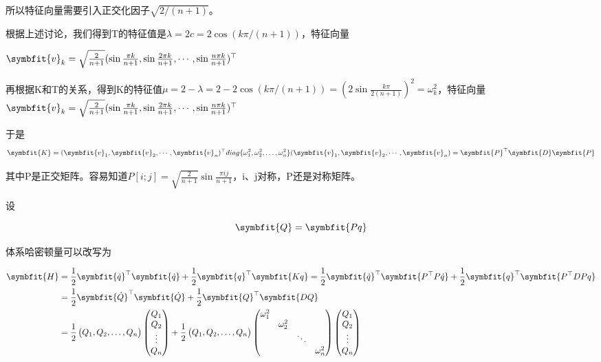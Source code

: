 \documentclass[10pt, a4paper]{article}
\newcommand\vbf{\symbfit}
\begin{document}
    所以特征向量需要引入正交化因子$\sqrt{2/(n+1)}$。

    根据上述讨论，我们得到T的特征值是$\lambda=2c=2\cos (k\pi/(n+1))$，特征向量
    
    $\vbf{v}_k=\sqrt{\frac{2}{n+1}}(\sin\frac{\pi k}{n+1},\sin\frac{2\pi k}{n+1},\cdots,\sin\frac{n\pi k}{n+1})^\top$

    再根据K和T的关系，得到K的特征值$\mu=2-\lambda=2-2\cos (k\pi/(n+1))=(2\sin\frac{k\pi}{2(n+1)})^2=\omega_k^2$，特征向量$\vbf{v}_k=\sqrt{\frac{2}{n+1}}(\sin\frac{\pi k}{n+1},\sin\frac{2\pi k}{n+1},\cdots,\sin\frac{n\pi k}{n+1})^\top$

    于是
    \[\vbf{K}=(\vbf{v}_1,\vbf{v}_2,\cdots,\vbf{v}_n)^\top diag\{\omega_1^2,\omega_2^2,\dots,\omega_n^2\}(\vbf{v}_1,\vbf{v}_2,\cdots,\vbf{v}_n)=\vbf{P}^\top\vbf{D}\vbf{P}\]

    其中P是正交矩阵。容易知道$P[i;j]=\sqrt{\frac{2}{n+1}}\sin\frac{\pi i j}{n+1}$，i、j对称，P还是对称矩阵。

    设

    \begin{equation}
        \vbf{Q}=\vbf{Pq}
    \end{equation}\label{eq:真实位形到简正模式的变换}
    
    体系哈密顿量可以改写为

    \begin{align*}
        \vbf{H}&=\frac{1}{2}\vbf{\dot{q} }^\top \vbf{\dot{q} }+\frac{1}{2}\vbf{q}^\top \vbf{Kq}=\frac{1}{2}\vbf{\dot{q} }^\top \vbf{P^\top P\dot{q} }+\frac{1}{2}\vbf{q}^\top \vbf{P^\top D P q}\\
        &=\frac{1}{2}\vbf{\dot{Q} }^\top \vbf{\dot{Q} }+\frac{1}{2}\vbf{Q}^\top \vbf{DQ}\\
        &=\frac{1}{2}\begin{pmatrix}
            Q_1,Q_2,\dots,Q_n
        \end{pmatrix}
        \begin{pmatrix}
            Q_1\\
            Q_2\\
            \vdots\\
            Q_n
        \end{pmatrix}   
        +\frac{1}{2}
        \begin{pmatrix}
            Q_1,Q_2,\dots,Q_n
        \end{pmatrix}
        \begin{pmatrix}
            \omega_1^2&&&\\
            &\omega_2^2&&\\
            &&\ddots&\\
            &&&\omega_n^2
        \end{pmatrix}
        \begin{pmatrix}
            Q_1\\
            Q_2\\
            \vdots\\
            Q_n
        \end{pmatrix}  
    \end{align*}
\end{document}
